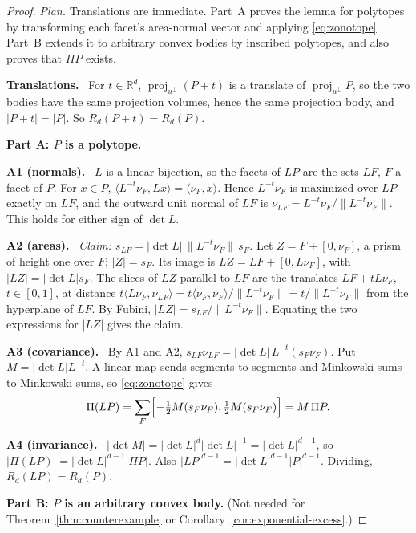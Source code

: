 \documentclass[11pt]{article}
\newcommand{\R}{\mathbb R}
\DeclareMathOperator{\proj}{proj}
\newcommand{\step}[1]{\par\smallskip\noindent\textbf{#1}\ }
\begin{document}
\begin{proof}
\emph{Plan.} Translations are immediate. Part~A proves the lemma for
polytopes by transforming each facet's area-normal vector and applying
\eqref{eq:zonotope}. Part~B extends it to arbitrary convex bodies by
inscribed polytopes, and also proves that \(\Pi P\) exists.

\step{Translations.} For \(t\in\R^d\),
\(\proj_{u^\perp}(P+t)\) is a translate of \(\proj_{u^\perp}P\), so the
two bodies have the same projection volumes, hence the same projection
body, and \(|P+t|=|P|\). So \(R_d(P+t)=R_d(P)\).

\medskip\noindent\textbf{Part A: \(P\) is a polytope.}

\step{A1 (normals).} \(L\) is a linear bijection, so the facets of
\(LP\) are the sets \(LF\), \(F\) a facet of \(P\). For \(x\in P\),
\(\langle L^{-t}\nu_F,Lx\rangle=\langle\nu_F,x\rangle\). Hence
\(L^{-t}\nu_F\) is maximized over \(LP\) exactly on \(LF\), and the
outward unit normal of \(LF\) is
\(\nu_{LF}=L^{-t}\nu_F/\|L^{-t}\nu_F\|\). This holds for either sign of
\(\det L\).

\step{A2 (areas).} \emph{Claim:
\(s_{LF}=|\det L|\,\|L^{-t}\nu_F\|\,s_F\).} Let
\(Z=F+[0,\nu_F]\), a prism of height one over \(F\); \(|Z|=s_F\). Its
image is \(LZ=LF+[0,L\nu_F]\), with \(|LZ|=|\det L|s_F\). The slices of
\(LZ\) parallel to \(LF\) are the translates \(LF+tL\nu_F\),
\(t\in[0,1]\), at distance
\(t\langle L\nu_F,\nu_{LF}\rangle
=t\langle\nu_F,\nu_F\rangle/\|L^{-t}\nu_F\|=t/\|L^{-t}\nu_F\|\) from
the hyperplane of \(LF\). By Fubini,
\(|LZ|=s_{LF}/\|L^{-t}\nu_F\|\). Equating the two expressions for
\(|LZ|\) gives the claim.

\step{A3 (covariance).} By A1 and A2,
\(s_{LF}\nu_{LF}=|\det L|\,L^{-t}(s_F\nu_F)\). Put
\(M=|\det L|L^{-t}\). A linear map sends segments to segments and
Minkowski sums to Minkowski sums, so \eqref{eq:zonotope} gives
\[
 \Pi(LP)=\sum_F\Bigl[-\tfrac12M(s_F\nu_F),\tfrac12M(s_F\nu_F)\Bigr]
 =M\,\Pi P .
\]

\step{A4 (invariance).} \(|\det M|=|\det L|^d|\det L|^{-1}
=|\det L|^{d-1}\), so \(|\Pi(LP)|=|\det L|^{d-1}|\Pi P|\). Also
\(|LP|^{d-1}=|\det L|^{d-1}|P|^{d-1}\). Dividing,
\(R_d(LP)=R_d(P)\).

\medskip\noindent\textbf{Part B: \(P\) is an arbitrary convex body.}
(Not needed for Theorem~\ref{thm:counterexample} or
Corollary~\ref{cor:exponential-excess}.)


\end{proof}
\end{document}
